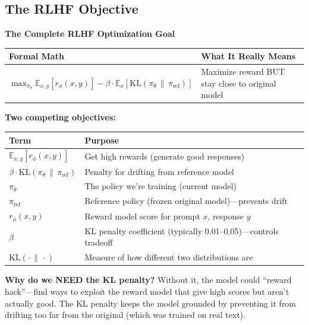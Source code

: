 \begin{chapterenv}
\subsection{The RLHF Objective}

\begin{infobox}
\textbf{The Complete RLHF Optimization Goal}

\begin{center}
\begin{tabular}{p{}p{}}
\toprule
\textbf{Formal Math} & \textbf{What It Really Means} \\
\midrule
$\max_{\pi_\theta} \mathbb{E}_{x,y}\!\left[r_\phi(x,y)\right] - \beta \cdot \mathbb{E}_x\!\left[\text{KL}(\pi_\theta \,\|\, \pi_{\text{ref}})\right]$ & Maximize reward BUT stay close to original model \\
\bottomrule
\end{tabular}
\end{center}

\textbf{Two competing objectives:}

\begin{center}
\begin{tabular}{p{}p{}}
\toprule
\textbf{Term} & \textbf{Purpose} \\
\midrule
$\mathbb{E}_{x,y}\!\left[r_\phi(x,y)\right]$ & Get high rewards (generate good responses) \\
$\beta \cdot \text{KL}(\pi_\theta \,\|\, \pi_{\text{ref}})$ & Penalty for drifting from reference model \\
\midrule
$\pi_\theta$ & The policy we're training (current model) \\
$\pi_{\text{ref}}$ & Reference policy (frozen original model)---prevents drift \\
$r_\phi(x,y)$ & Reward model score for prompt $x$, response $y$ \\
$\beta$ & KL penalty coefficient (typically 0.01--0.05)---controls tradeoff \\
$\text{KL}(\cdot \,\|\, \cdot)$ & Measure of how different two distributions are \\
\bottomrule
\end{tabular}
\end{center}

\textbf{Why do we NEED the KL penalty?} Without it, the model could ``reward hack''---find ways to exploit the reward model that give high scores but aren't actually good. The KL penalty keeps the model grounded by preventing it from drifting too far from the original (which was trained on real text).
\end{infobox}


\end{chapterenv}
